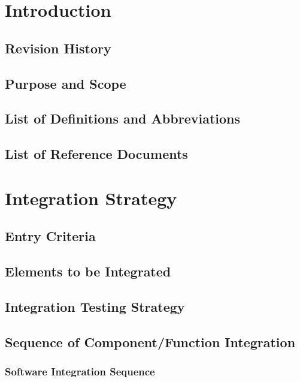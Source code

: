 \documentclass{article}
\begin{document}
\newpage   			
\begin{flushleft}  

  \section{Introduction}	%
  \subsection{Revision History} 		%
  \subsection{Purpose and Scope}		%
  \subsection{List of Definitions and Abbreviations }		%
  \subsection{List of Reference Documents}		%
  
  
  
  \section{Integration Strategy }  		%
   \subsection{Entry Criteria}		%
   \subsection{Elements to be Integrated }		%
   \subsection{Integration Testing Strategy}		%
   \subsection{Sequence of Component/Function Integration}		%
   
  
  \subsubsection{Software  Integration  Sequence}		%

\end{flushleft}
\end{document}
